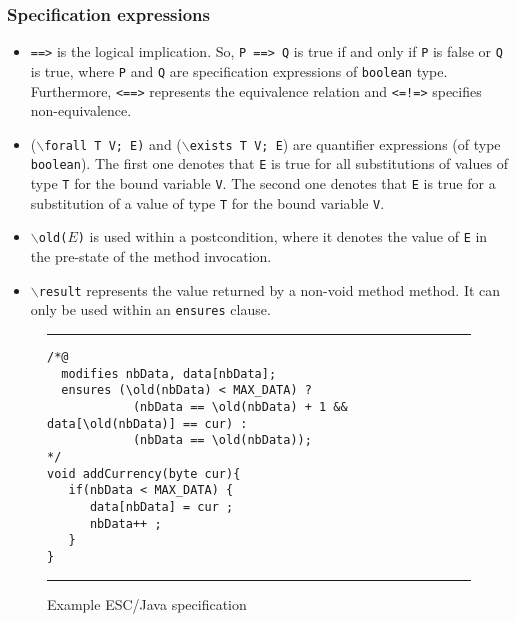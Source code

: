 \documentclass[a4paper]{llncs}
\begin{document}
\subsubsection{Specification expressions}
\begin{itemize}
\item{\texttt{==>}} is the logical implication. So, \texttt{P
==> Q} is true if and only if \texttt{P} is false or \texttt{Q} is
true, where \texttt{P} and \texttt{Q} are specification expressions of 
\texttt{boolean} type. Furthermore, \texttt{<==>} represents the
equivalence relation and \texttt{<=!=>} specifies non-equivalence.

\item {($\backslash$\texttt{forall T V; E)} and
($\backslash$\texttt{exists T V; E})} are quantifier expressions (of
type \texttt{boolean}).  The first one denotes that \texttt{E} is true
for all substitutions of values of type \texttt{T} for the bound
variable \texttt{V}. The second one denotes that \texttt{E} is true
for a substitution of a value of type \texttt{T} for the bound
variable \texttt{V}.

\item{\texttt{$\backslash$old($E$)}} is used within a postcondition, where it denotes the value of \texttt{E} in the pre-state of the method invocation.

\item {\tt$\backslash$result} represents the value returned by
a non-void method method. It can only be used within an
\texttt{ensures} clause.
\end{itemize}


\begin{figure}[t]
\rule{\linewidth}{0.3mm}
\begin{verbatim}
/*@
  modifies nbData, data[nbData];
  ensures (\old(nbData) < MAX_DATA) ?
            (nbData == \old(nbData) + 1 && data[\old(nbData)] == cur) :
            (nbData == \old(nbData));
*/
void addCurrency(byte cur){
   if(nbData < MAX_DATA) {
      data[nbData] = cur ;
      nbData++ ;
   }
}
\end{verbatim}
\caption{Example ESC/Java specification}
\label{fig-add-cur}
\rule{\linewidth}{0.3mm}
\end{figure}
\end{document}
